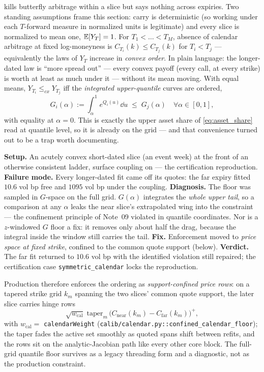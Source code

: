 \documentclass[11pt]{article}
\begin{document}
 kills butterfly arbitrage within a slice but says nothing
across expiries. Two standing assumptions frame this section: carry is
deterministic (so working under each $T$-forward measure in normalized units is
legitimate) and every slice is normalized to mean one, $\mathbb{E}[Y_T]=1$. For
$T_1<\dots<T_M$, absence of calendar arbitrage at fixed log-moneyness is
$C_{T_i}(k)\le C_{T_j}(k)$ for $T_i<T_j$ --- equivalently the laws of $Y_T$
increase in \emph{convex order}. In plain language: the longer-dated law is
``more spread out'' --- every convex payoff (every call, at every strike) is
worth at least as much under it --- without its mean moving. With equal means,
$Y_{T_i}\le_{cx}Y_{T_j}$ iff the \emph{integrated upper-quantile} curves are
ordered,
\begin{equation}
G_i(\alpha):=\int_\alpha^1 e^{Q_i(u)}\dd u\;\le\;G_j(\alpha)\quad\forall\alpha\in[0,1],
\label{eq:calendar}
\end{equation}
with equality at $\alpha=0$. This is exactly the upper asset share of
\eqref{eq:asset_share} read at quantile level, so it is already on the grid ---
and that convenience turned out to be a trap worth documenting.

\begin{example}[title={Case file: the acute weekly that bulldozed the ladder}]
\textbf{Setup.} An acutely convex short-dated slice (an event week) at the
front of an otherwise consistent ladder, surface coupling on --- the
certification reproduction. \textbf{Failure mode.} Every longer-dated fit
came off its quotes: the far expiry fitted $10.6$ vol bp free and $1095$ vol
bp under the coupling. \textbf{Diagnosis.} The floor was sampled in
$G$-space on the full grid. $G(\alpha)$ integrates the \emph{whole upper
tail}, so a comparison at any $\alpha$ leaks the near slice's extrapolated
wing into the constraint --- the confinement principle of Note~09 violated
in quantile coordinates. Nor is a $z$-windowed $G$ floor a fix: it removes
only about half the drag, because the integral inside the window still
carries the tail. \textbf{Fix.} Enforcement moved to \emph{price space at
fixed strike}, confined to the common quote support (below).
\textbf{Verdict.} The far fit returned to $10.6$ vol bp with the identified
violation still repaired; the certification case
\texttt{symmetric\_calendar} locks the reproduction.
\end{example}

Production therefore enforces the ordering as \emph{support-confined price
rows}: on a tapered strike grid $k_m$ spanning the two slices' common quote
support, the later slice carries hinge rows
\begin{equation}
\sqrt{w_{\text{cal}}}\;\mathrm{taper}_m\,
\big(C_{\text{near}}(k_m)-C_{\text{far}}(k_m)\big)^{+},
\label{eq:cal_rows}
\end{equation}
with $w_{\text{cal}}=$ \texttt{calendarWeight}
(\texttt{calib/calendar.py::confined\_calendar\_floor}); the taper fades the
active set smoothly as quoted spans shift between refits, and the rows sit on
the analytic-Jacobian path like every other core block. The full-grid
quantile floor survives as a legacy threading form and a diagnostic, not as
the production constraint.
\end{document}
